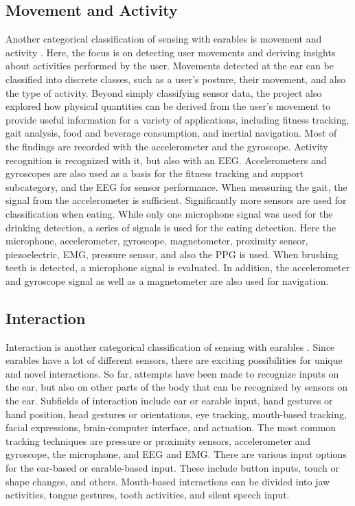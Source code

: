 \subsection{Movement and Activity}
\label{Background:SensingWithEarables:Movement}
Another categorical classification of sensing with earables is movement and activity \cite{roddigerSensingEarablesSystematic2022a}.
Here, the focus is on detecting user movements and deriving insights about activities performed by the user. 
Movements detected at the ear can be classified into discrete classes, such as a user's posture, their movement, and also the type of activity. 
Beyond simply classifying sensor data, the project also explored how physical quantities can be derived from the user's movement to provide useful information for a variety of applications, including fitness tracking, gait analysis,
food and beverage consumption, and inertial navigation.
Most of the findings are recorded with the accelerometer and the gyroscope.
Activity recognition is recognized with it, but also with an EEG. Accelerometers and gyroscopes are also used as a basis for the fitness tracking and support subcategory, and the EEG for sensor performance.
When measuring the gait, the signal from the accelerometer is sufficient.
Significantly more sensors are used for classification when eating. While only one microphone signal was used for the drinking detection, a series of signals is used for the eating detection. 
Here the microphone, accelerometer, gyroscope, magnetometer, proximity sensor, piezoelectric, EMG, pressure sensor, and also the PPG is used.
When brushing teeth is detected, a microphone signal is evaluated.
In addition, the accelerometer and gyroscope signal as well as a magnetometer are also used for navigation.

\subsection{Interaction}
\label{Background:SensingWithEarables:Interaction}
Interaction is another categorical classification of sensing with earables \cite{roddigerSensingEarablesSystematic2022a}.
Since earables have a lot of different sensors, there are exciting possibilities for unique and novel interactions.
So far, attempts have been made to recognize inputs on the ear, but also on other parts of the body that can be recognized by sensors on the ear.
Subfields of interaction include ear or earable input, hand gestures or hand position, head gestures or orientations, eye tracking, mouth-based tracking, facial expressions, brain-computer interface, and actuation.
The most common tracking techniques are pressure or proximity sensors, accelerometer and gyroscope, the microphone, and EEG and EMG.
There are various input options for the ear-based or earable-based input. These include button inputs, touch or shape changes, and others.
Mouth-based interactions can be divided into jaw activities, tongue gestures, tooth activities, and silent speech input.

